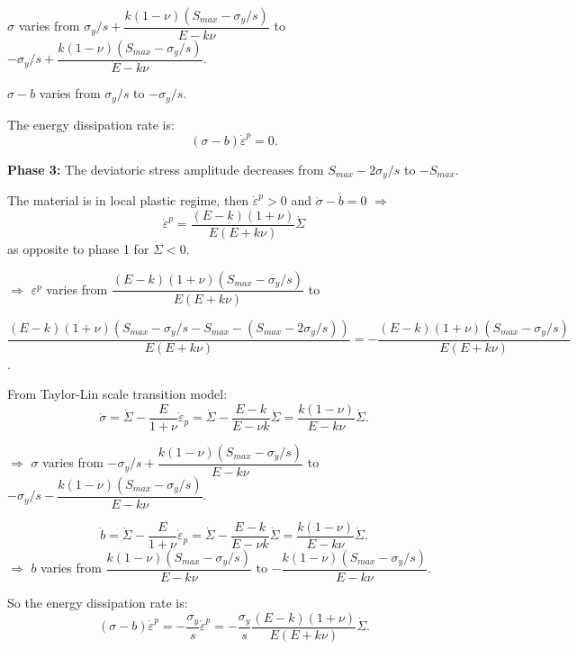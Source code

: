\documentclass[3p,times,procedia,number]{elsarticle}
\begin{document}
\vspace{6pt}
\noindent
$\sigma$ varies from $\sigma_y/s+\dfrac{k(1-\nu)(S_{max}-\sigma_y/s)}{E-k\nu}$ to $-\sigma_y/s+\dfrac{k(1-\nu)(S_{max}-\sigma_y/s)}{E-k\nu}$.

\vspace{6pt}
\noindent
$\sigma-b$ varies from $\sigma_y/s$ to $-\sigma_y/s$.

\vspace{6pt}
\noindent
The energy dissipation rate is: $$(\sigma-b)\dot{\varepsilon}^p=0.$$

\vspace{6pt}
\noindent
\textbf{Phase 3:} The deviatoric stress amplitude decreases from $S_{max}-2\sigma_y/s$ to $-S_{max}$.

\noindent
The material is in local plastic regime, then $\dot{\varepsilon}^p>0$ and $\dot{\sigma}-\dot{b}=0$ $\Rightarrow$ 
$$\dot{\varepsilon}^p=\dfrac{(E- k)(1+\nu)}{E(E+k\nu)}\dot{\Sigma}$$ as opposite to phase 1 for $\dot{\Sigma}<0$.

\vspace{6pt}
\noindent
$\Rightarrow$ $\varepsilon^p$ varies from $\dfrac{(E- k)(1+\nu)(S_{max}-\sigma_y/s)}{E(E+k\nu)}$ to 

\noindent
$\dfrac{(E- k)(1+\nu)(S_{max}-\sigma_y/s-S_{max}-(S_{max}-2\sigma_y/s))}{E(E+k\nu)}=-\dfrac{(E- k)(1+\nu)(S_{max}-\sigma_y/s)}{E(E+k\nu)}$.

\vspace{6pt}
\noindent
From Taylor-Lin scale transition model:
$$\dot{\sigma}=\dot{\Sigma}-\dfrac{E}{1+\nu}\dot{\varepsilon}_p=\dot{\Sigma}-\dfrac{E-k}{E-\nu k}\dot{\Sigma}=\dfrac{k(1-\nu)}{E-k\nu}\dot{\Sigma}.$$

\vspace{6pt}
\noindent
$\Rightarrow$ $\sigma$ varies from $-\sigma_y/s+\dfrac{k(1-\nu)(S_{max}-\sigma_y/s)}{E-k\nu}$ to $-\sigma_y/s-\dfrac{k(1-\nu)(S_{max}-\sigma_y/s)}{E-k\nu}$.

\vspace{6pt}
$$\dot{b}=\dot{\Sigma}-\dfrac{E}{1+\nu}\dot{\varepsilon}_p=\dot{\Sigma}-\dfrac{E-k}{E-\nu k}\dot{\Sigma}=\dfrac{k(1-\nu)}{E-k\nu}\dot{\Sigma}.$$
\vspace{6pt}
\noindent
$\Rightarrow$ $b$ varies from $\dfrac{k(1-\nu)(S_{max}-\sigma_y/s)}{E-k\nu}$ to $-\dfrac{k(1-\nu)(S_{max}-\sigma_y/s)}{E-k\nu}$.

\vspace{6pt}
\noindent
So the energy dissipation rate is: $$(\sigma-b)\dot{\varepsilon}^p=-\dfrac{\sigma_y}{s}\dot{\varepsilon}^p=-\dfrac{\sigma_y}{s}\dfrac{(E- k)(1+\nu)}{E(E+k\nu)}\dot{\Sigma}.$$
\end{document}
